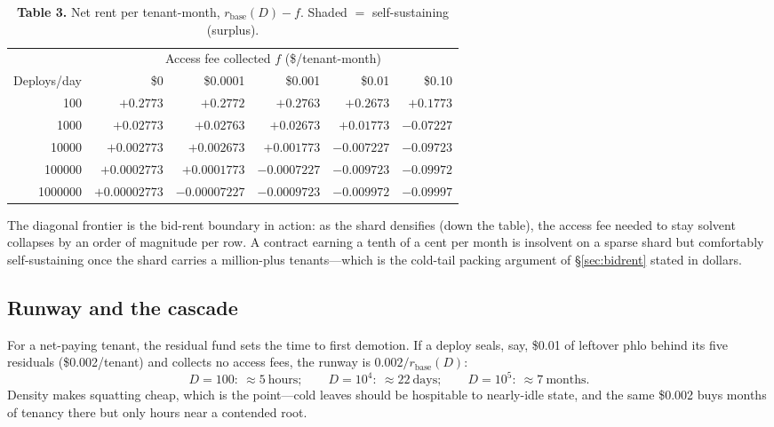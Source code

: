 \documentclass[11pt]{article}
\newcommand{\rent}{r}
\begin{document}
\begin{table}[h]
\centering
\caption*{\textbf{Table 3.} Net rent per tenant-month, $\rent_{\text{base}}(D)-f$. Shaded $=$ self-sustaining (surplus).}
\setlength{\tabcolsep}{5pt}
\renewcommand{\arraystretch}{1.15}
\begin{tabular}{@{}r|rrrrr@{}}
\toprule
 & \multicolumn{5}{c}{Access fee collected $f$ (\$/tenant-month)} \\
Deploys/day & \$0 & \$0.0001 & \$0.001 & \$0.01 & \$0.10 \\
\midrule
\num{100}    & $+0.2773$ & $+0.2772$ & $+0.2763$ & $+0.2673$ & $+0.1773$ \\
\num{1000}   & $+0.02773$ & $+0.02763$ & $+0.02673$ & $+0.01773$ & \cellcolor{coolrow}$-0.07227$ \\
\num{10000}  & $+0.002773$ & $+0.002673$ & $+0.001773$ & \cellcolor{coolrow}$-0.007227$ & \cellcolor{coolrow}$-0.09723$ \\
\num{100000} & $+0.0002773$ & $+0.0001773$ & \cellcolor{coolrow}$-0.0007227$ & \cellcolor{coolrow}$-0.009723$ & \cellcolor{coolrow}$-0.09972$ \\
\num{1000000}& $+0.00002773$ & \cellcolor{coolrow}$-0.00007227$ & \cellcolor{coolrow}$-0.0009723$ & \cellcolor{coolrow}$-0.009972$ & \cellcolor{coolrow}$-0.09997$ \\
\bottomrule
\end{tabular}
\end{table}

\noindent The diagonal frontier is the bid-rent boundary in action: as the shard densifies (down the table), the access fee needed to stay solvent collapses by an order of magnitude per row. A contract earning a tenth of a cent per month is insolvent on a sparse shard but comfortably self-sustaining once the shard carries a million-plus tenants---which is the cold-tail packing argument of \S\ref{sec:bidrent} stated in dollars.

\subsection{Runway and the cascade}
For a net-paying tenant, the residual fund sets the time to first demotion. If a deploy seals, say, \$0.01 of leftover phlo behind its five residuals (\$0.002/tenant) and collects no access fees, the runway is $0.002/\rent_{\text{base}}(D)$:
\[
D=100:\ \approx 5\ \text{hours};\qquad
D=10^4:\ \approx 22\ \text{days};\qquad
D=10^5:\ \approx 7\ \text{months}.
\]
Density makes squatting cheap, which is the point---cold leaves should be hospitable to nearly-idle state, and the same \$0.002 buys months of tenancy there but only hours near a contended root.
\end{document}
